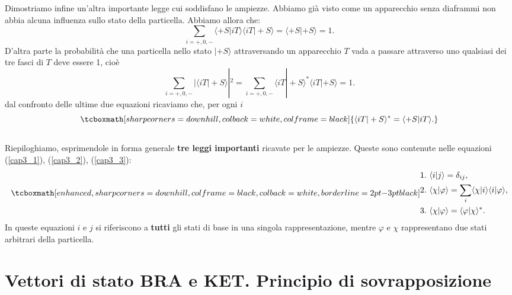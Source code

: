 Dimostriamo infine un'altra importante legge cui soddisfano le ampiezze. Abbiamo già visto come un apparecchio senza diaframmi non abbia alcuna influenza sullo stato della particella. Abbiamo allora che:
	\begin{equation}
	\sum \limits_{i=+,0,-}\langle +S | iT \rangle \langle iT | +S \rangle = \langle +S | +S \rangle =1 .
	\end{equation}
D'altra parte la probabilità che una particella nello stato $| +S \rangle$ attraversando un apparecchio $T$ vada a passare attraverso uno qualsiasi dei tre fasci di $T$ deve essere 1, cioè
	\begin{equation}
		\sum \limits_{i=+,0,-}|\langle iT | +S \rangle|^2= \sum \limits_{i=+,0,-} \langle iT | +S \rangle ^* \langle iT | +S \rangle= 1 .
	\end{equation}
dal confronto delle ultime due equazioni ricaviamo che, per ogni $i$
	\begin{equation}
 		\tcboxmath[sharp corners=downhill, colback=white, colframe=black]{
 			\langle iT | +S \rangle ^* = \langle +S | iT \rangle .
 			}
	\label{cap3_3}
	\end{equation}\\

Riepiloghiamo, esprimendole in forma generale \textbf{tre leggi importanti} ricavate per le ampiezze.
Queste sono contenute nelle equazioni (\ref{cap3_1}), (\ref{cap3_2}), (\ref{cap3_3}):
	\begin{equation}
		\tcboxmath[enhanced, sharp corners=downhill, colframe=black, colback=white, borderline={2pt}{-3pt}{black}]{
			\begin{aligned}
				&\textrm{1.}\ \langle i | j \rangle=\delta_{ij},\\
				&\textrm{2.}\ \langle \chi | \varphi \rangle=\sum \limits_{i} \langle \chi | i \rangle \langle i | \varphi \rangle,\\
				&\textrm{3.}\ \langle \chi | \varphi \rangle = \langle \varphi | \chi \rangle ^* .
			\end{aligned}
			}
	\end{equation}
In queste equazioni $i$ e $j$ si riferiscono a \textbf{tutti} gli stati di base in una singola rappresentazione, mentre $\varphi$ e $\chi$ rappresentano due stati arbitrari della particella.

\section[Principio di sovrapposizione]{Vettori di stato BRA e KET. Principio di sovrapposizione} 

